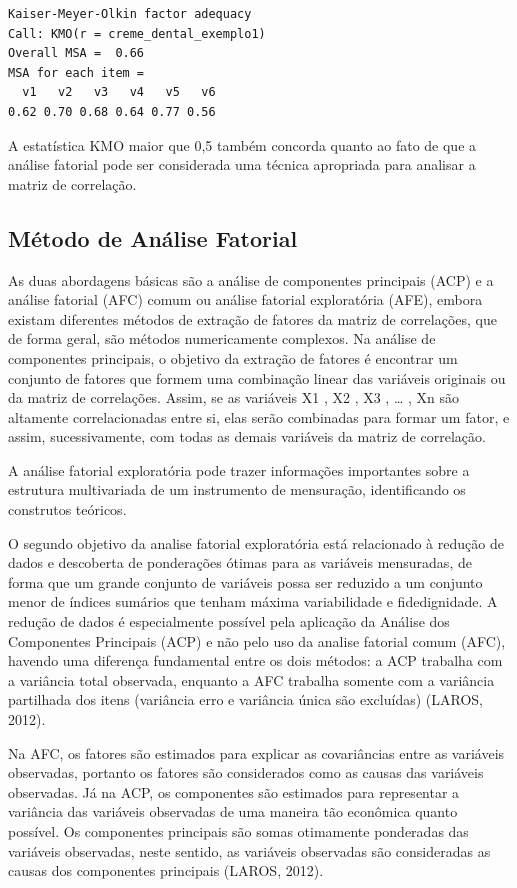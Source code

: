 \documentclass[12pt,brazil,oneside]{book}
\begin{document}
\begin{verbatim}
Kaiser-Meyer-Olkin factor adequacy
Call: KMO(r = creme_dental_exemplo1)
Overall MSA =  0.66
MSA for each item = 
  v1   v2   v3   v4   v5   v6 
0.62 0.70 0.68 0.64 0.77 0.56 
\end{verbatim}

A estatística KMO maior que 0,5 também concorda quanto ao fato de que a
análise fatorial pode ser considerada uma técnica apropriada para
analisar a matriz de correlação.

\hypertarget{metodo-de-analise-fatorial}{%
\subsection{Método de Análise
Fatorial}\label{metodo-de-analise-fatorial}}

As duas abordagens básicas são a análise de componentes principais (ACP)
e a análise fatorial (AFC) comum ou análise fatorial exploratória (AFE),
embora existam diferentes métodos de extração de fatores da matriz de
correlações, que de forma geral, são métodos numericamente complexos. Na
análise de componentes principais, o objetivo da extração de fatores é
encontrar um conjunto de fatores que formem uma combinação linear das
variáveis originais ou da matriz de correlações. Assim, se as variáveis
X1 , X2 , X3 , \ldots{} , Xn são altamente correlacionadas entre si,
elas serão combinadas para formar um fator, e assim, sucessivamente, com
todas as demais variáveis da matriz de correlação.

A análise fatorial exploratória pode trazer informações importantes
sobre a estrutura multivariada de um instrumento de mensuração,
identificando os construtos teóricos.

O segundo objetivo da analise fatorial exploratória está relacionado à
redução de dados e descoberta de ponderações ótimas para as variáveis
mensuradas, de forma que um grande conjunto de variáveis possa ser
reduzido a um conjunto menor de índices sumários que tenham máxima
variabilidade e fidedignidade. A redução de dados é especialmente
possível pela aplicação da Análise dos Componentes Principais (ACP) e
não pelo uso da analise fatorial comum (AFC), havendo uma diferença
fundamental entre os dois métodos: a ACP trabalha com a variância total
observada, enquanto a AFC trabalha somente com a variância partilhada
dos itens (variância erro e variância única são excluídas) (LAROS,
2012).

Na AFC, os fatores são estimados para explicar as covariâncias entre as
variáveis observadas, portanto os fatores são considerados como as
causas das variáveis observadas. Já na ACP, os componentes são estimados
para representar a variância das variáveis observadas de uma maneira tão
econômica quanto possível. Os componentes principais são somas
otimamente ponderadas das variáveis observadas, neste sentido, as
variáveis observadas são consideradas as causas dos componentes
principais (LAROS, 2012).
\end{document}
